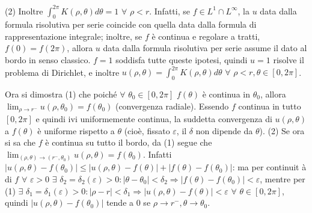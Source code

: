 \documentclass{article}
\begin{document}
(2) Inoltre $\int_{0}^{2\pi }K\left( \rho ,\theta \right) d\theta =1$ $%
\forall $ $\rho <r$. Infatti, se $f\in L^{1}\cap L^{\infty }$, la $u$ data
dalla formula risolutiva per serie coincide con quella data dalla formula di
rappresentazione integrale; inoltre, se $f$ \`{e} continua e regolare a
tratti, $f\left( 0\right) =f\left( 2\pi \right) $, allora $u$ data dalla
formula risolutiva per serie assume il dato al bordo in senso classico. $f=1$
soddisfa tutte queste ipotesi, quindi $u=1$ risolve il problema di
Dirichlet, e inoltre $u\left( \rho ,\theta \right) =\int_{0}^{2\pi }K\left(
\rho ,\theta \right) d\theta $ $\forall $ $\rho <r,\theta \in \left[ 0,2\pi %
\right] $.

Ora si dimostra (1) che poich\'{e} $\forall $ $\theta _{0}\in \left[ 0,2\pi %
\right] $ $f\left( \theta \right) $ \`{e} continua in $\theta _{0}$, allora $%
\lim_{\rho \rightarrow r^{-}}u\left( \rho ,\theta _{0}\right) =f\left(
\theta _{0}\right) $ (convergenza radiale). Essendo $f$ continua in tutto $%
\left[ 0,2\pi \right] $ e quindi ivi uniformemente continua, la suddetta
convergenza di $u\left( \rho ,\theta \right) $ a $f\left( \theta \right) $ 
\`{e} uniforme rispetto a $\theta $ (cio\`{e}, fissato $\varepsilon $, il $%
\delta $ non dipende da $\theta $). (2) Se ora si sa che $f$ \`{e} continua
su tutto il bordo, da (1) segue che $\lim_{\left( \rho ,\theta \right)
\rightarrow \left( r^{-},\theta _{0}\right) }u\left( \rho ,\theta \right)
=f\left( \theta _{0}\right) $. Infatti $\left\vert u\left( \rho ,\theta
\right) -f\left( \theta _{0}\right) \right\vert \leq \left\vert u\left( \rho
,\theta \right) -f\left( \theta \right) \right\vert +\left\vert f\left(
\theta \right) -f\left( \theta _{0}\right) \right\vert $: ma per continuit%
\`{a} di $f$ $\forall $ $\varepsilon >0$ $\exists $ $\delta _{2}=\delta
_{2}\left( \varepsilon \right) >0:\left\vert \theta -\theta _{0}\right\vert
<\delta _{2}\Longrightarrow \left\vert f\left( \theta \right) -f\left(
\theta _{0}\right) \right\vert <\varepsilon $, mentre per (1) $\exists $ $%
\delta _{1}=\delta _{1}\left( \varepsilon \right) >0:\left\vert \rho
-r\right\vert <\delta _{1}\Longrightarrow \left\vert u\left( \rho ,\theta
\right) -f\left( \theta \right) \right\vert <\varepsilon $ $\forall $ $%
\theta \in \left[ 0,2\pi \right] $, quindi $\left\vert u\left( \rho ,\theta
\right) -f\left( \theta _{0}\right) \right\vert $ tende a $0$ se $\rho
\rightarrow r^{-},\theta \rightarrow \theta _{0}$.
\end{document}
